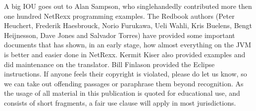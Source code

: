 A big IOU goes out to Alan Sampson, who singlehandedly contributed more then one hundred NetRexx programming examples. The Redbook authors (Peter Heuchert, Frederik Haesbrouck, Norio Furukawa, Ueli Wahli, Kris Buelens, Bengt Heijnesson, Dave Jones and Salvador Torres) have provided some important documents that has shown, in an early stage, how almost everything on the JVM is better and easier done in NetRexx. Kermit Kiser also provided examples and did maintenance on the translator. Bill Finlason provided the Eclipse instructions. If anyone feels their copyright is violated, please do let us know, so we can take out offending passages or paraphrase them beyond recognition. As the usage of all material in this publication is quoted for educational use, and consists of short fragments, a fair use clause will apply in most jurisdictions.

